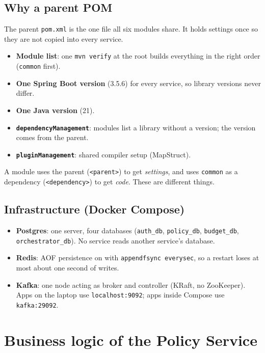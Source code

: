 \documentclass[11pt,a4paper]{article}
\newcommand{\code}[1]{\texttt{\small #1}}
\begin{document}
\subsection{Why a parent POM}
The parent \code{pom.xml} is the one file all six modules share. It holds settings once
so they are not copied into every service.

\begin{itemize}
  \item \textbf{Module list}: one \code{mvn verify} at the root builds everything in the right order (\code{common} first).
  \item \textbf{One Spring Boot version} (3.5.6) for every service, so library versions never differ.
  \item \textbf{One Java version} (21).
  \item \textbf{\code{dependencyManagement}}: modules list a library without a version; the version comes from the parent.
  \item \textbf{\code{pluginManagement}}: shared compiler setup (MapStruct).
\end{itemize}

A module uses the parent (\code{<parent>}) to get \emph{settings}, and uses \code{common}
as a dependency (\code{<dependency>}) to get \emph{code}. These are different things.

\subsection{Infrastructure (Docker Compose)}
\begin{itemize}
  \item \textbf{Postgres}: one server, four databases (\code{auth\_db}, \code{policy\_db}, \code{budget\_db}, \code{orchestrator\_db}). No service reads another service's database.
  \item \textbf{Redis}: AOF persistence on with \code{appendfsync everysec}, so a restart loses at most about one second of writes.
  \item \textbf{Kafka}: one node acting as broker and controller (KRaft, no ZooKeeper). Apps on the laptop use \code{localhost:9092}; apps inside Compose use \code{kafka:29092}.
\end{itemize}

\section{Business logic of the Policy Service}
\end{document}
